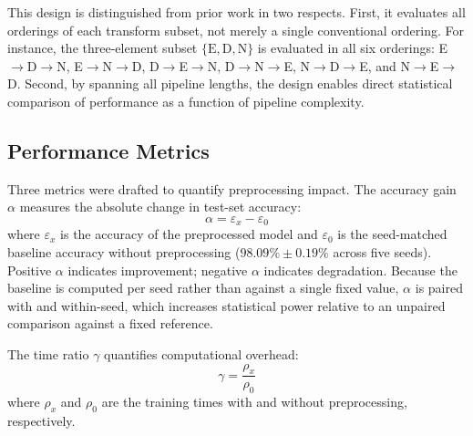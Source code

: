 \documentclass[preprint,5p,times,twocolumn]{elsarticle}
\begin{document}
This design is distinguished from prior work in two respects. First, it evaluates all orderings of each transform subset, not merely a single conventional ordering. For instance, the three-element subset $\{\text{E}, \text{D}, \text{N}\}$ is evaluated in all six orderings: E$\to$D$\to$N, E$\to$N$\to$D, D$\to$E$\to$N, D$\to$N$\to$E, N$\to$D$\to$E, and N$\to$E$\to$D. Second, by spanning all pipeline lengths, the design enables direct statistical comparison of performance as a function of pipeline complexity.

\subsection{Performance Metrics}

Three metrics were drafted to quantify preprocessing impact. The accuracy gain $\alpha$ measures the absolute change in test-set accuracy:
\begin{equation}
\alpha = \varepsilon_x - \varepsilon_0
\label{eq:alpha}
\end{equation}
where $\varepsilon_x$ is the accuracy of the preprocessed model and $\varepsilon_0$ is the seed-matched baseline accuracy without preprocessing ($98.09\% \pm 0.19\%$ across five seeds). Positive $\alpha$ indicates improvement; negative $\alpha$ indicates degradation. Because the baseline is computed per seed rather than against a single fixed value, $\alpha$ is paired with and within-seed, which increases statistical power relative to an unpaired comparison against a fixed reference.

The time ratio $\gamma$ quantifies computational overhead:
\begin{equation}
\gamma = \frac{\rho_x}{\rho_0}
\label{eq:gamma}
\end{equation}
where $\rho_x$ and $\rho_0$ are the training times with and without preprocessing, respectively.
\end{document}
